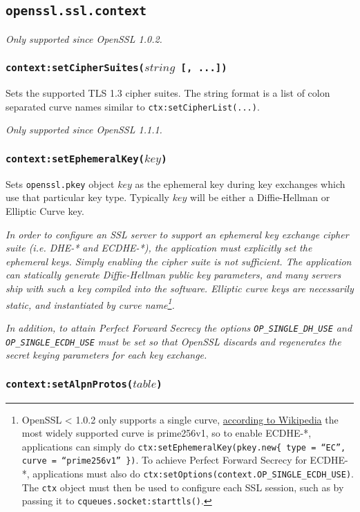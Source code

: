 \documentclass[11pt, oneside]{memoir}
\newcommand*{\fn}[1]{\texttt{#1}\xspace}
\newcommand*{\module}[1]{\texttt{#1}\xspace}
\newcounter{toccols}
\newenvironment{Module}[1]{
	\subsection{\texttt{#1}}
	\addtocontents{toc}{
		\protect\begin{multicols}{\value{toccols}}
	}
}{
	\addtocontents{toc}{\protect\end{multicols}}
}
\begin{document}
\begin{Module}{openssl.ssl.context}
\emph{Only supported since OpenSSL 1.0.2.}

\subsubsection[\fn{context:setCipherSuites}]{\fn{context:setCipherSuites($string$ [, ...])}}

Sets the supported TLS 1.3 cipher suites. The string format is a list of colon separated curve names similar to \texttt{ctx:setCipherList(...)}.

\emph{Only supported since OpenSSL 1.1.1.}

\subsubsection[\fn{context:setEphemeralKey}]{\fn{context:setEphemeralKey($key$)}}

Sets \module{openssl.pkey} object $key$ as the ephemeral key during key exchanges which use that particular key type. Typically $key$ will be either a Diffie-Hellman or Elliptic Curve key.

\emph{In order to configure an SSL server to support an ephemeral key exchange cipher suite (i.e. DHE-* and ECDHE-*), the application must explicitly set the ephemeral keys. Simply enabling the cipher suite is not sufficient. The application can statically generate Diffie-Hellman public key parameters, and many servers ship with such a key compiled into the software. Elliptic curve keys are necessarily static, and instantiated by curve name\footnote{OpenSSL < 1.0.2 only supports a single curve, \href{http://en.wikipedia.org/w/index.php?title=Comparison\_of\_TLS\_implementations&oldid=629779090\#Supported\_elliptic\_curves}{according to Wikipedia} the most widely supported curve is prime256v1, so to enable ECDHE-*, applications can simply do \texttt{ctx:setEphemeralKey(pkey.new\{ type = ``EC'', curve = ``prime256v1'' \})}. To achieve Perfect Forward Secrecy for ECDHE-*, applications must also do \texttt{ctx:setOptions(context.OP\_SINGLE\_ECDH\_USE)}. The \texttt{ctx} object must then be used to configure each SSL session, such as by passing it to \fn{cqueues.socket:starttls()}.}.}

\emph{In addition, to attain Perfect Forward Secrecy the options \texttt{OP\_SINGLE\_DH\_USE} and \texttt{OP\_SINGLE\_ECDH\_USE} must be set so that OpenSSL discards and regenerates the secret keying parameters for each key exchange.}

\subsubsection[\fn{context:setAlpnProtos}]{\fn{context:setAlpnProtos($table$)}}


\end{Module}
\end{document}
